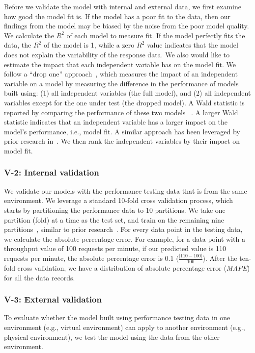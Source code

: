\documentclass[smallextended]{svjour3}       %
\begin{document}
Before we validate the model with internal and external data, we first examine how good the model fit is. If the model has a poor fit to the data, then our findings from the model may be biased by the noise from the poor model quality. We calculate the $R^2$ of each model to measure fit. If the model perfectly fits the data, the $R^2$ of the model is 1, while a zero $R^2$ value indicates that the model does not explain the variability of the response data. We also would like to estimate the impact that each independent variable has on the model fit. We follow a ``drop one'' approach~\cite{Chambers1990}, which measures the impact of an independent variable on a model by measuring the difference in the performance of models built using: (1) all independent variables (the full model), and (2) all independent variables except for the one under test (the dropped model). A Wald statistic is reported by comparing the performance of these two models ~\cite{harrell2001regression}. A larger Wald statistic indicates that an independent variable has a larger impact on the model's performance, i.e., model fit. A similar approach has been leveraged by prior research in~\cite{mcintosh2015emse}. We then rank the independent variables by their impact on model fit. 


\subsubsection{V-2: Internal validation}

We validate our models with the performance testing data that is from the same environment. We leverage a standard 10-fold cross validation process, which starts by partitioning the performance data to 10 partitions. We take one partition (fold) at a time as the test set, and train on the remaining nine partitions~\cite{10foldcross,kohavi1995study}, similar to prior research~\cite{haroon}. For every data point in the testing data, we calculate the absolute percentage error. For example, for a data point with a throughput value of 100 requests per minute, if our predicted value is 110 requests per minute, the absolute percentage error is $0.1$ ($\frac{|110-100|}{100}$). After the ten-fold cross validation, we have a distribution of absolute percentage error (\textit{MAPE}) for all the data records.



\subsubsection{V-3: External validation}
To evaluate whether the model built using performance testing data in one environment (e.g., virtual environment) can apply to another environment (e.g., physical environment), we test the model using the data from the other environment.
\end{document}
